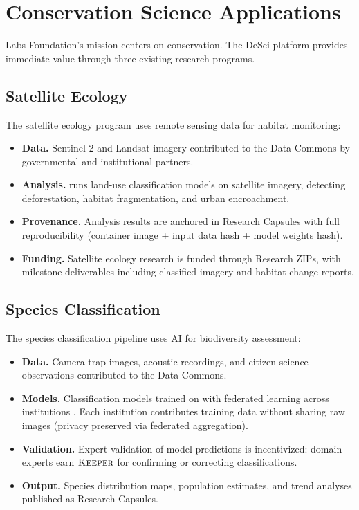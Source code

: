 \section{Conservation Science Applications}

\label{sec:conservation}

\Zoo{} Labs Foundation's mission centers on conservation. The DeSci platform provides immediate value through three existing research programs.

\subsection{Satellite Ecology}

The \Zoo{} satellite ecology program \cite{zoo-satellite-ecology} uses remote sensing data for habitat monitoring:

\begin{itemize}
    \item \textbf{Data.} Sentinel-2 and Landsat imagery contributed to the Data Commons by governmental and institutional partners.
    \item \textbf{Analysis.} \AChain{} runs land-use classification models on satellite imagery, detecting deforestation, habitat fragmentation, and urban encroachment.
    \item \textbf{Provenance.} Analysis results are anchored in Research Capsules with full reproducibility (container image + input data hash + model weights hash).
    \item \textbf{Funding.} Satellite ecology research is funded through Research ZIPs, with milestone deliverables including classified imagery and habitat change reports.
\end{itemize}

\subsection{Species Classification}

The species classification pipeline \cite{zoo-species-classification} uses AI for biodiversity assessment:

\begin{itemize}
    \item \textbf{Data.} Camera trap images, acoustic recordings, and citizen-science observations contributed to the Data Commons.
    \item \textbf{Models.} Classification models trained on \AChain{} with federated learning across institutions \cite{zoo-federated-wildlife}. Each institution contributes training data without sharing raw images (privacy preserved via federated aggregation).
    \item \textbf{Validation.} Expert validation of model predictions is incentivized: domain experts earn $\textsc{Keeper}$ for confirming or correcting classifications.
    \item \textbf{Output.} Species distribution maps, population estimates, and trend analyses published as Research Capsules.
\end{itemize}

